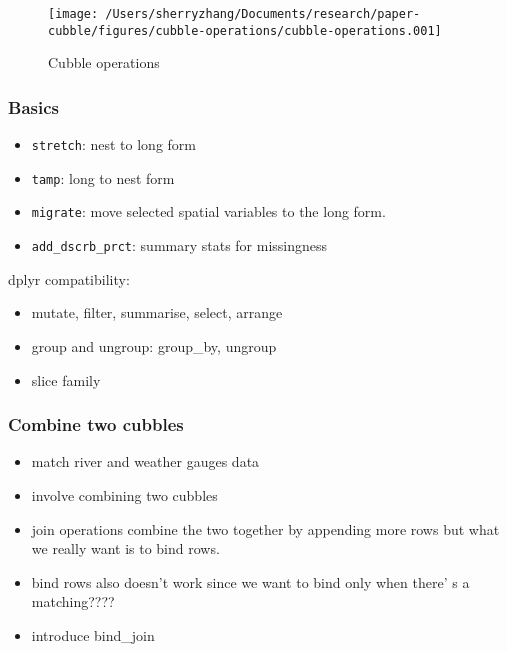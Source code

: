 \documentclass{article}
\begin{document}
\begin{figure}

{\centering \texttt{[image: /Users/sherryzhang/Documents/research/paper-cubble/figures/cubble-operations/cubble-operations.001]} 

}

\caption{Cubble operations}\label{fig:cubble-operations}
\end{figure}

\hypertarget{basics}{%
\subsubsection{Basics}\label{basics}}

\begin{itemize}
\tightlist
\item
  \texttt{stretch}: nest to long form
\item
  \texttt{tamp}: long to nest form
\item
  \texttt{migrate}: move selected spatial variables to the long form.
\item
  \texttt{add\_dscrb\_prct}: summary stats for missingness
\end{itemize}

dplyr compatibility:

\begin{itemize}
\tightlist
\item
  mutate, filter, summarise, select, arrange
\item
  group and ungroup: group\_by, ungroup
\item
  slice family
\end{itemize}

\hypertarget{combine-two-cubbles}{%
\subsubsection{Combine two cubbles}\label{combine-two-cubbles}}

\begin{itemize}
\tightlist
\item
  match river and weather gauges data
\item
  involve combining two cubbles
\item
  join operations combine the two together by appending more rows but
  what we really want is to bind rows.
\item
  bind rows also doesn't work since we want to bind only when there' s a
  matching????
\item
  introduce bind\_join
\end{itemize}
\end{document}

